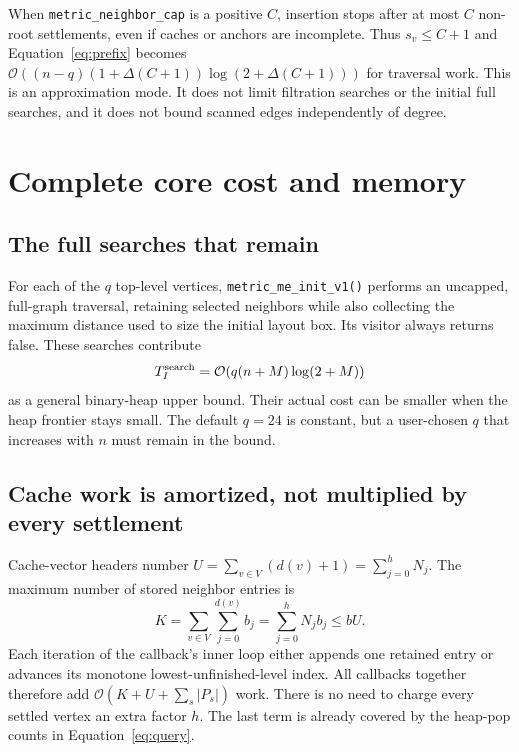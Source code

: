 \documentclass[11pt,a4paper]{article}
\newcommand{\bigO}{\mathcal O}
\newcommand{\code}[1]{\texttt{#1}}
\begin{document}
When \code{metric\_neighbor\_cap} is a positive $C$, insertion stops after at
most $C$ non-root settlements, even if caches or anchors are incomplete. Thus
$s_v\leq C+1$ and Equation~\eqref{eq:prefix} becomes
$\bigO((n-q)(1+\Delta(C+1))\log(2+\Delta(C+1)))$ for traversal work. This is
an approximation mode. It does not limit filtration searches or the initial
full searches, and it does not bound scanned edges independently of degree.

\clearpage
\section{Complete core cost and memory}

\subsection{The full searches that remain}

For each of the $q$ top-level vertices, \code{metric\_me\_init\_v1()} performs
an uncapped, full-graph traversal, retaining selected neighbors while also
collecting the maximum distance used to size the initial layout box. Its visitor
always returns false. These searches contribute
\begin{equation}
 T_I^{\rm search}=\bigO\!\left(q(n+M)\log(2+M)\right)
 \label{eq:initial}
\end{equation}
as a general binary-heap upper bound. Their actual cost can be smaller when
the heap frontier stays small. The default $q=24$ is constant, but a user-chosen
$q$ that increases with $n$ must remain in the bound.

\subsection{Cache work is amortized, not multiplied by every settlement}

Cache-vector headers number
$U=\sum_{v\in V}(d(v)+1)=\sum_{j=0}^{h}N_j$. The maximum number of stored
neighbor entries is
\begin{equation}
 K=\sum_{v\in V}\sum_{j=0}^{d(v)}b_j
   =\sum_{j=0}^{h}N_jb_j\leq bU.
 \label{eq:cache}
\end{equation}
Each iteration of the callback's inner loop either appends one retained entry
or advances its monotone lowest-unfinished-level index. All callbacks together
therefore add $\bigO(K+U+\sum_s |P_s|)$ work. There is no need to charge every
settled vertex an extra factor $h$. The last term is already covered by the
heap-pop counts in Equation~\eqref{eq:query}.
\end{document}
